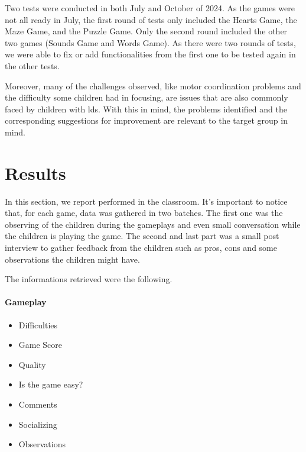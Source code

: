 Two tests were conducted in both July and October of 2024. As the games were not all ready in July, the first round of tests only included the Hearts Game, the Maze Game, and the Puzzle Game. Only the second round included the other two games (Sounds Game and Words Game). As there were two rounds of tests, we were able to fix or add functionalities from the first one to be tested again in the other tests.

Moreover, many of the challenges observed, like motor coordination problems and the difficulty some children had in focusing, are issues that are also commonly faced by children with \glspl{ld}. With this in mind, the problems identified and the corresponding suggestions for improvement are relevant to the target group in mind.

\section{Results}
\label{c5Results}

In this section, we report  performed in the classroom. It's important to notice that, for each game, data was gathered in two batches. The first one was the observing of the children during the gameplays and even small conversation while the children is playing the game. The second and last part was a small post interview to gather feedback from the children such as pros, cons and some observations the children might have.

The informations retrieved were the following.

\paragraph{Gameplay}
\begin{itemize}
    \item Difficulties
    \item Game Score
    \item Quality
    \item Is the game easy?
    \item Comments
    \item Socializing
    \item Observations
\end{itemize}

